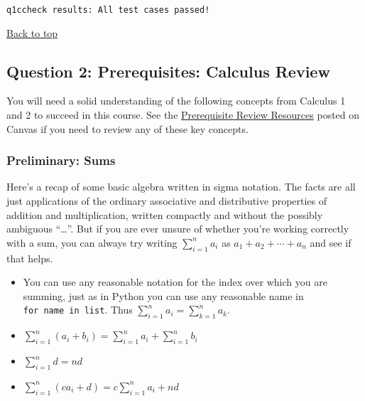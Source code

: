 \documentclass[11pt]{article}
\makeatletter
\providecommand{\tightlist}{%
      \setlength{\itemsep}{0pt}\setlength{\parskip}{0pt}}
\newcommand{\boxspacing}{\kern\kvtcb@left@rule\kern\kvtcb@boxsep}
\newcommand{\prompt}[4]{
        {\ttfamily\llap{{\color{#2}[#3]:\hspace{3pt}#4}}\vspace{-\baselineskip}}
    }
\makeatother
\begin{document}
            \begin{tcolorbox}[breakable, size=fbox, boxrule=.5pt, pad at break*=1mm, opacityfill=0]
\prompt{Out}{outcolor}{8}{\boxspacing}
\begin{Verbatim}[commandchars=\\\{\}]
q1ccheck results: All test cases passed!
\end{Verbatim}
\end{tcolorbox}
        
    \hyperref[top]{Back to top}

\subsection{\texorpdfstring{ Question 2: Prerequisites: Calculus
Review}{ Question 2: Prerequisites: Calculus Review}}\label{question-2-prerequisites-calculus-review}

You will need a solid understanding of the following concepts from
Calculus 1 and 2 to succeed in this course. See the
\href{https://canvas.colorado.edu/courses/101142/pages/prerequisite-review-calculus-and-discrete-structures?module_item_id=5144193}{Prerequisite
Review Resources} posted on Canvas if you need to review any of these
key concepts.

\subsubsection{Preliminary: Sums}\label{preliminary-sums}

Here's a recap of some basic algebra written in sigma notation. The
facts are all just applications of the ordinary associative and
distributive properties of addition and multiplication, written
compactly and without the possibly ambiguous ``\ldots{}''. But if you
are ever unsure of whether you're working correctly with a sum, you can
always try writing \(\sum_{i=1}^n a_i\) as \(a_1 + a_2 + \cdots + a_n\)
and see if that helps.

\begin{itemize}
\tightlist
\item
  You can use any reasonable notation for the index over which you are
  summing, just as in Python you can use any reasonable name in
  \texttt{for\ name\ in\ list}. Thus
  \(\sum_{i=1}^n a_i = \sum_{k=1}^n a_k\).
\item
  \(\sum_{i=1}^n (a_i + b_i) = \sum_{i=1}^n a_i + \sum_{i=1}^n b_i\)
\item
  \(\sum_{i=1}^n d = nd\)
\item
  \(\sum_{i=1}^n (ca_i + d) = c\sum_{i=1}^n a_i + nd\)
\end{itemize}
\end{document}

